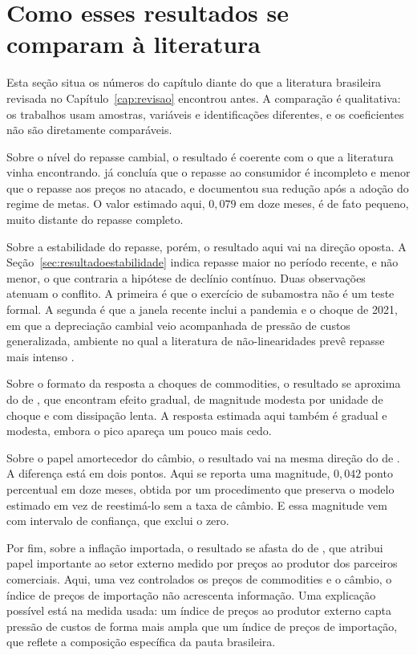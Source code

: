 \documentclass[12pt,openright,oneside,a4paper,portuguese,brazil]{abntex2}
\begin{document}
\section{Como esses resultados se comparam à literatura}
\label{sec:comparacao}

Esta seção situa os números do capítulo diante do que a literatura brasileira
revisada no Capítulo~\ref{cap:revisao} encontrou antes. A comparação é
qualitativa: os trabalhos usam amostras, variáveis e identificações
diferentes, e os coeficientes não são diretamente comparáveis.

Sobre o nível do repasse cambial, o resultado é coerente com o que a
literatura vinha encontrando.  já concluía que o repasse ao consumidor é
incompleto e menor que o repasse aos preços no atacado, e
 documentou sua redução após a adoção do regime de
metas. O valor estimado aqui, $0{,}079$ em doze meses, é de fato pequeno, muito
distante do repasse completo.

Sobre a estabilidade do repasse, porém, o resultado aqui vai na direção
oposta. A Seção~\ref{sec:resultadoestabilidade} indica repasse maior no
período recente, e não menor, o que contraria a hipótese de declínio contínuo.
Duas observações atenuam o conflito. A primeira é que o exercício de subamostra
não é um teste formal. A segunda é que a janela recente inclui a pandemia e o
choque de 2021, em que a depreciação cambial veio acompanhada de pressão de
custos generalizada, ambiente no qual a literatura de não-linearidades prevê
repasse mais intenso \cite{correaminella2010}.

Sobre o formato da resposta a choques de commodities, o resultado se aproxima do
de , que encontram efeito gradual, de magnitude
modesta por unidade de choque e com dissipação lenta. A resposta estimada aqui
também é gradual e modesta, embora o pico apareça um pouco mais cedo.

Sobre o papel amortecedor do câmbio, o resultado vai na mesma direção do de
. A diferença está em dois pontos. Aqui se reporta uma magnitude, $0{,}042$
ponto percentual em doze meses, obtida por um procedimento que preserva o
modelo estimado em vez de reestimá-lo sem a taxa de câmbio. E essa magnitude
vem com intervalo de confiança, que exclui o zero.

Por fim, sobre a inflação importada, o resultado se afasta do de
, que atribui papel importante ao setor externo medido
por preços ao produtor dos parceiros comerciais. Aqui, uma vez controlados os
preços de commodities e o câmbio, o índice de preços de importação não acrescenta
informação. Uma explicação possível está na medida usada: um índice de preços ao produtor
externo capta pressão de custos de forma mais ampla que um índice de preços de
importação, que reflete a composição específica da pauta brasileira.
\end{document}
